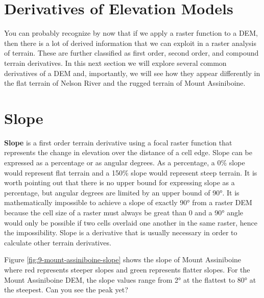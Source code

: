 \documentclass[
]{book}
\begin{document}
\hypertarget{derivatives-of-elevation-models}{%
\section{Derivatives of Elevation Models}\label{derivatives-of-elevation-models}}

You can probably recognize by now that if we apply a raster function to a DEM, then there is a lot of derived information that we can exploit in a raster analysis of terrain. These are further classified as first order, second order, and compound terrain derivatives. In this next section we will explore several common derivatives of a DEM and, importantly, we will see how they appear differently in the flat terrain of Nelson River and the rugged terrain of Mount Assiniboine.

\hypertarget{slope}{%
\section{Slope}\label{slope}}

\textbf{Slope} is a first order terrain derivative using a focal raster function that represents the change in elevation over the distance of a cell edge. Slope can be expressed as a percentage or as angular degrees. As a percentage, a 0\% slope would represent flat terrain and a 150\% slope would represent steep terrain. It is worth pointing out that there is no upper bound for expressing slope as a percentage, but angular degrees are limited by an upper bound of 90°. It is mathematically impossible to achieve a slope of exactly 90° from a raster DEM because the cell size of a raster must always be great than 0 and a 90° angle would only be possible if two cells overlaid one another in the same raster, hence the impossibility. Slope is a derivative that is usually necessary in order to calculate other terrain derivatives.

Figure \ref{fig:9-mount-assiniboine-slope} shows the slope of Mount Assiniboine where red represents steeper slopes and green represents flatter slopes. For the Mount Assiniboine DEM, the slope values range from 2° at the flattest to 80° at the steepest. Can you see the peak yet?
\end{document}
